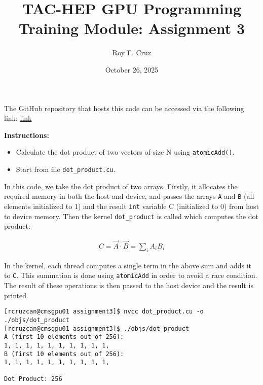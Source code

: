 \documentclass{article}
\title{
    TAC-HEP GPU Programming Training Module: Assignment 3
}
\author{Roy F. Cruz}
\newcounter{exercise}
\newenvironment{exr}[1]{%
    \refstepcounter{exercise}
    \begin{tcolorbox}[colback=blue!5!white, colframe=blue!75!black, title=Exercise \theexercise]
    \textbf{Instructions:} #1
    \end{tcolorbox}
    \vspace{1em}
}{}
\begin{document}
\date{October 26, 2025}
\maketitle

The GitHub repository that hosts this code can be accessed via the following link: \href{https://github.com/roy-cruz/TAC-HEP_GPU-Course_Assignments/tree/master}{link}

\begin{exr}{
    \begin{itemize}
        \item Calculate the dot product of two vectors of size N using \texttt{atomicAdd()}.
        \item Start from file \texttt{dot\_product.cu}.
    \end{itemize}
    }
\end{exr}

In this code, we take the dot product of two arrays. Firstly, it allocates the required memory in both the host and device, and passes the arrays \texttt{A} and \texttt{B} (all elements initialized to 1) and the result \texttt{int} variable C (initialized to 0) from host to device memory. Then the kernel \texttt{dot\_product} is called which computes the dot product:

\begin{align*}
    C = \vec A \cdot \vec B = \sum_{i}A_iB_i
\end{align*}

\noindent In the kernel, each thread computes a single term in the above sum and adds it to \texttt{C}. This summation is done using \texttt{atomicAdd} in order to avoid a race condition. The result of these operations is then passed to the host device and the result is printed.



\begin{lstlisting}[style=output]
[rcruzcan@cmsgpu01 assignment3]$ nvcc dot_product.cu -o ./objs/dot_product 
[rcruzcan@cmsgpu01 assignment3]$ ./objs/dot_product 
A (first 10 elements out of 256):
1, 1, 1, 1, 1, 1, 1, 1, 1, 1, 
B (first 10 elements out of 256):
1, 1, 1, 1, 1, 1, 1, 1, 1, 1, 

Dot Product: 256
\end{lstlisting}


\end{document}
